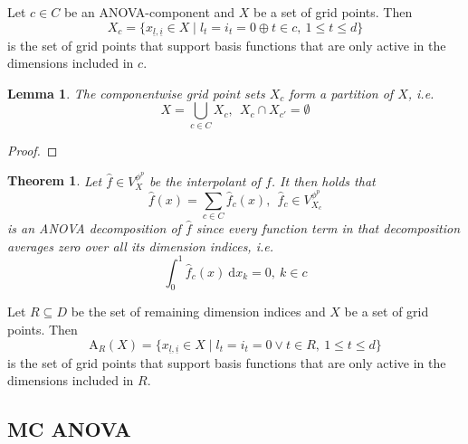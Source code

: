 \documentclass[
  a4paper,  %
  twoside,  %
  bibliography=totoc,
  headsepline,
  cleardoublepage=empty,
  parskip=half,
  draft=false
]{scrbook}
\newtheorem{proof}{Proof}
\newtheorem{lemma}{Lemma}
\newtheorem{theorem}{Theorem}
\begin{document}
\begin{definition}
Let $c \in C$ be an ANOVA-component and $X$ be a set of grid points.
Then
\begin{equation}
X_c=\{x_{\underline{l},\underline{i}} \in X \mid l_t=i_t=0 \oplus t \in c, ~ 1 \leq t \leq d\}
\end{equation}
is the set of grid points that support basis functions that are only active in the dimensions included in $c$.
\end{definition}

\begin{lemma}
The componentwise grid point sets $X_c$ form a partition of $X$, i.e.
\begin{equation}
X=\bigcup_{c \in C} X_c, ~~ X_c \cap X_{c'} = \emptyset
\end{equation}
\end{lemma}
\begin{proof}
\end{proof}

\begin{theorem}
Let $\hat{f} \in V_{X}^{\phi^p}$ be the interpolant of $f$.
It then holds that
\begin{equation}
\hat{f}(x)=\sum_{c \in C} \hat{f}_{c}(x), ~~ \hat{f}_c \in V_{X_c}^{\phi^p}
\end{equation}
is an ANOVA decomposition of $\hat{f}$ since every function term in that decomposition averages zero over all its dimension indices, i.e.
\begin{equation}
\int_0^1 \hat{f}_c(x) ~ \text{d}x_k = 0, ~ k \in c
\end{equation}
\end{theorem}

\begin{definition}
Let $R \subseteq D$ be the set of remaining dimension indices and $X$ be a set of grid points.
Then
\begin{equation}
\text{A}_R(X)=\{x_{\underline{l},\underline{i}} \in X \mid l_t=i_t=0 \lor t \in R, ~ 1 \leq t \leq d\}
\end{equation}
is the set of grid points that support basis functions that are only active in the dimensions included in $R$.
\end{definition}


\newpage
\subsection{MC ANOVA}
\end{document}
